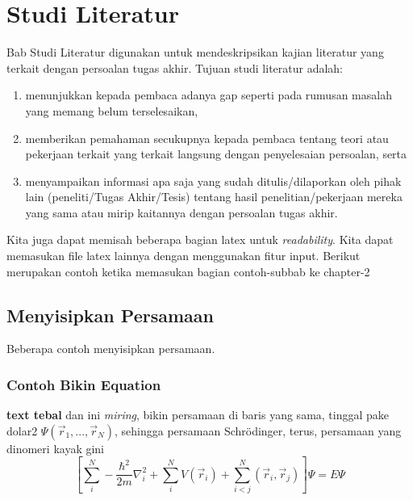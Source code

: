 \chapter{Studi Literatur}
\label{chapter:studi-literatur}

Bab Studi Literatur digunakan untuk mendeskripsikan kajian literatur yang terkait dengan persoalan tugas akhir. Tujuan studi literatur adalah:

\begin{enumerate}
	\item menunjukkan kepada pembaca adanya gap seperti pada rumusan masalah yang memang belum terselesaikan,
	\item memberikan pemahaman secukupnya kepada pembaca tentang teori atau pekerjaan terkait yang terkait langsung dengan penyelesaian persoalan, serta
	\item menyampaikan informasi apa saja yang sudah ditulis/dilaporkan oleh pihak lain (peneliti/Tugas Akhir/Tesis) tentang hasil penelitian/pekerjaan mereka yang sama atau mirip kaitannya dengan persoalan tugas akhir.
\end{enumerate}

Kita juga dapat memisah beberapa bagian latex untuk \textit{readability}. Kita dapat memasukan file latex lainnya dengan menggunakan fitur input. Berikut merupakan contoh ketika memasukan bagian contoh-subbab ke chapter-2


\section{Menyisipkan Persamaan}

Beberapa contoh menyisipkan persamaan.

\subsection{Contoh Bikin Equation}
\textbf{text tebal} dan ini \emph{miring}, bikin persamaan di baris yang sama, tinggal pake dolar2 $\Psi(\vec{r}_1,...,\vec{r}_N)$, sehingga persamaan Schr\"{o}dinger, terus, persamaan yang dinomeri kayak gini
\begin{equation}
	\left[ \sum_{i}^{N}-\frac{\hbar^2}{2m}\nabla_i^2 + \sum_{i}^{N}V(\vec{r}_i)+ \sum_{i<j}^{N}(\vec{r}_i,\vec{r}_j)\right]\Psi = E\Psi
\end{equation}

